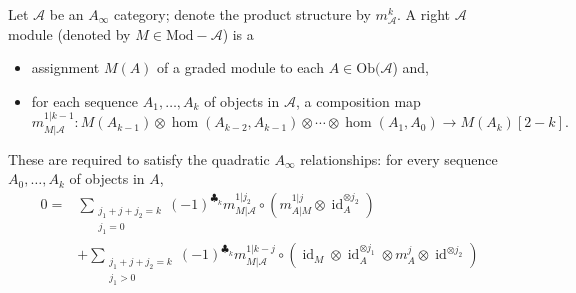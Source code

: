 
 
 
Let $\mathcal A$ be  an \emph{$A_\infty$} category; denote the product structure by $m^k_\mathcal A$. A right $\mathcal A$ module (denoted by $M\in \text{Mod}-\mathcal A$) is a 
\begin{itemize}
    \item assignment $M(A)$ of a graded module to each $A\in \text{Ob}(\mathcal A$) and,
    \item for each sequence $A_1, \ldots, A_k$ of objects in $\mathcal A$, a composition map 
    \[
        m^{1|{k-1}}_{M|\mathcal A}:M(A_{k-1})\otimes \hom(A_{k-2}, A_{k-1})\otimes \cdots \otimes \hom(A_1, A_0)\to M(A_k)[2-k].
    \]
\end{itemize}
These are required to satisfy the quadratic  $A_\infty$ relationships: for every sequence   $A_0, \ldots, A_k$ of objects in $A$,
\begin{align*}
    0=&\sum_{\substack{ j_1+j+j_2=k\\j_1=0 }} (-1)^{\clubsuit_k} m_{M|\mathcal A}^{1|j_2} \circ (m_{A|M}^{1|j}\otimes  \operatorname{id}_A^{\otimes j_2})\\
    &+\sum_{\substack{ j_1+j+j_2=k\\j_1>0 }} (-1)^{\clubsuit_k} m_{M|{\mathcal A}}^{1|k-j}\circ ( \operatorname{id}_M\otimes  \operatorname{id}_A^{\otimes j_1}\otimes m^{j}_A \otimes \operatorname{id}^{\otimes j_2})
\end{align*}

 